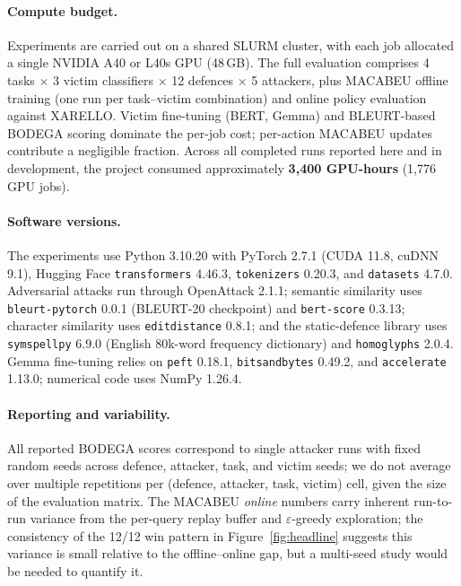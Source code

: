 \documentclass[11pt]{article}
\begin{document}
\paragraph{Compute budget.} Experiments are carried out on a shared SLURM cluster, with each job allocated a single NVIDIA A40 or L40s GPU (48\,GB). The full evaluation comprises 4 tasks $\times$ 3 victim classifiers $\times$ 12 defences $\times$ 5 attackers, plus MACABEU offline training (one run per task--victim combination) and online policy evaluation against XARELLO. Victim fine-tuning (BERT, Gemma) and BLEURT-based BODEGA scoring dominate the per-job cost; per-action MACABEU updates contribute a negligible fraction. Across all completed runs reported here and in development, the project consumed approximately \textbf{3{,}400 GPU-hours} (1{,}776 GPU jobs).

\paragraph{Software versions.} The experiments use Python 3.10.20 with PyTorch 2.7.1 (CUDA 11.8, cuDNN 9.1), Hugging Face \texttt{transformers} 4.46.3, \texttt{tokenizers} 0.20.3, and \texttt{datasets} 4.7.0. Adversarial attacks run through OpenAttack 2.1.1; semantic similarity uses \texttt{bleurt-pytorch} 0.0.1 (BLEURT-20 checkpoint) and \texttt{bert-score} 0.3.13; character similarity uses \texttt{editdistance} 0.8.1; and the static-defence library uses \texttt{symspellpy} 6.9.0 (English 80k-word frequency dictionary) and \texttt{homoglyphs} 2.0.4. Gemma fine-tuning relies on \texttt{peft} 0.18.1, \texttt{bitsandbytes} 0.49.2, and \texttt{accelerate} 1.13.0; numerical code uses NumPy 1.26.4.

\paragraph{Reporting and variability.} All reported BODEGA scores correspond to single attacker runs with fixed random seeds across defence, attacker, task, and victim seeds; we do not average over multiple repetitions per (defence, attacker, task, victim) cell, given the size of the evaluation matrix. The MACABEU \emph{online} numbers carry inherent run-to-run variance from the per-query replay buffer and $\varepsilon$-greedy exploration; the consistency of the 12/12 win pattern in Figure~\ref{fig:headline} suggests this variance is small relative to the offline--online gap, but a multi-seed study would be needed to quantify it.
\end{document}
